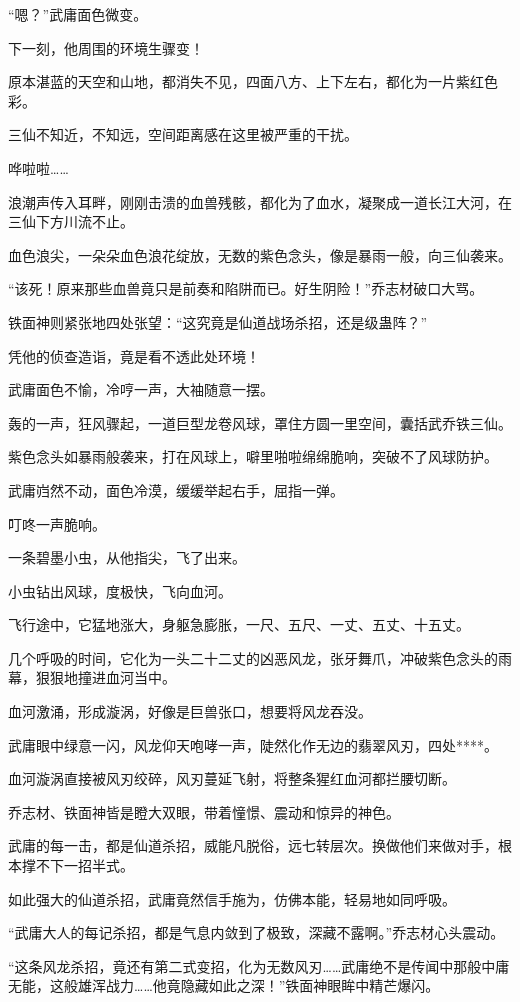 \begin{this_body}
“嗯？”武庸面色微变。

下一刻，他周围的环境生骤变！

原本湛蓝的天空和山地，都消失不见，四面八方、上下左右，都化为一片紫红色彩。

三仙不知近，不知远，空间距离感在这里被严重的干扰。

哗啦啦……

浪潮声传入耳畔，刚刚击溃的血兽残骸，都化为了血水，凝聚成一道长江大河，在三仙下方川流不止。

血色浪尖，一朵朵血色浪花绽放，无数的紫色念头，像是暴雨一般，向三仙袭来。

“该死！原来那些血兽竟只是前奏和陷阱而已。好生阴险！”乔志材破口大骂。

铁面神则紧张地四处张望：“这究竟是仙道战场杀招，还是级蛊阵？”

凭他的侦查造诣，竟是看不透此处环境！

武庸面色不愉，冷哼一声，大袖随意一摆。

轰的一声，狂风骤起，一道巨型龙卷风球，罩住方圆一里空间，囊括武乔铁三仙。

紫色念头如暴雨般袭来，打在风球上，噼里啪啦绵绵脆响，突破不了风球防护。

武庸岿然不动，面色冷漠，缓缓举起右手，屈指一弹。

叮咚一声脆响。

一条碧墨小虫，从他指尖，飞了出来。

小虫钻出风球，度极快，飞向血河。

飞行途中，它猛地涨大，身躯急膨胀，一尺、五尺、一丈、五丈、十五丈。

几个呼吸的时间，它化为一头二十二丈的凶恶风龙，张牙舞爪，冲破紫色念头的雨幕，狠狠地撞进血河当中。

血河激涌，形成漩涡，好像是巨兽张口，想要将风龙吞没。

武庸眼中绿意一闪，风龙仰天咆哮一声，陡然化作无边的翡翠风刃，四处****。

血河漩涡直接被风刃绞碎，风刃蔓延飞射，将整条猩红血河都拦腰切断。

乔志材、铁面神皆是瞪大双眼，带着憧憬、震动和惊异的神色。

武庸的每一击，都是仙道杀招，威能凡脱俗，远七转层次。换做他们来做对手，根本撑不下一招半式。

如此强大的仙道杀招，武庸竟然信手施为，仿佛本能，轻易地如同呼吸。

“武庸大人的每记杀招，都是气息内敛到了极致，深藏不露啊。”乔志材心头震动。

“这条风龙杀招，竟还有第二式变招，化为无数风刃……武庸绝不是传闻中那般中庸无能，这般雄浑战力……他竟隐藏如此之深！”铁面神眼眸中精芒爆闪。


\end{this_body}

